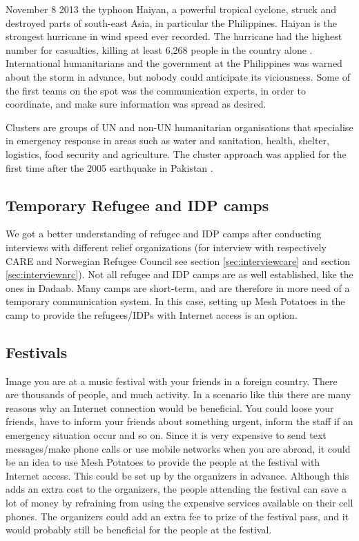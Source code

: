 November 8 2013 the typhoon Haiyan, a powerful tropical cyclone, struck and destroyed parts of south-east Asia, in particular the Philippines. Haiyan is the strongest hurricane in wind speed ever recorded. The hurricane had the highest number for casualties, killing at least 6,268 people in the country alone \cite{wikiHaiyan}. International humanitarians and the government at the Philippines was warned about the storm in advance, but nobody could anticipate its viciousness. Some of the first teams on the spot was the communication experts, in order to coordinate, and make sure information was spread as desired.    \cite{disasterResponse} 

Clusters are groups of UN and non-UN humanitarian organisations that specialise in emergency response in areas such as water and sanitation, health, shelter, logistics, food security and agriculture. The cluster approach was applied for the first time after the 2005 earthquake in Pakistan \cite{disasterResponse}.


\subsection{Temporary Refugee and IDP camps}
We got a better understanding of refugee and IDP camps after conducting interviews with different relief organizations (for interview with respectively CARE and Norwegian Refugee Council see section \ref{sec:interviewcare} and section \ref{sec:interviewnrc}). 
Not all refugee and IDP camps are as well established, like the ones in Dadaab. Many camps are short-term, and are therefore in more need of a temporary communication system. In this case, setting up Mesh Potatoes in the camp to provide the refugees/IDPs with Internet access is an option. 

\subsection{Festivals}
Image you are at a music festival with your friends in a foreign country. There are thousands of people, and much activity. In a scenario like this there are many reasons why an Internet connection would be beneficial. You could loose your friends, have to inform your friends about something urgent, inform the staff if an emergency situation occur and so on. Since it is very expensive to send text messages/make phone calls or use mobile networks when you are abroad, it could be an idea to use Mesh Potatoes to provide the people at the festival with Internet access. This could be set up by the organizers in advance. Although this adds an extra cost to the organizers, the people attending the festival can save a lot of money by refraining from using the expensive services available on their cell phones. The organizers could add an extra fee to prize of the festival pass, and it would probably still be beneficial for the people at the festival. 

